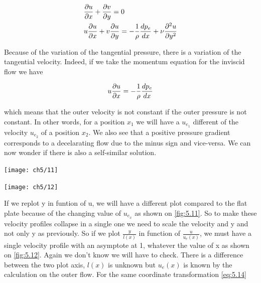 	\begin{equation}
		\begin{aligned}
		&\frac{\partial u}{\partial x} + \frac{\partial v}{\partial y} = 0\\
		&u \frac{\partial u}{\partial x} + v \frac{\partial u}{\partial y} =- \frac{1}{\rho} \frac{dp_e}{dx}+ \nu \frac{\partial ^2 u}{\partial y^2}
	\end{aligned}	
	\label{eq:5.44}
	\end{equation}
	
	Because of the variation of the tangential pressure, there is a variation of the tangential velocity. Indeed, if we take the momentum equation for the inviscid flow we have 
	
	\begin{equation}
		u \frac{\partial u}{\partial x} =- \frac{1}{\rho} \frac{dp_e}{dx}
	\end{equation}
	
	which means that the outer velocity is not constant if the outer pressure is not constant. In other words, for a position $x_1$ we will have a $u_{e_1}$ different of the velocity $u_{e_2}$ of a position $x_2$. We also see that a positive pressure gradient corresponds to a decelarating flow due to the minus sign and vice-versa. We can now wonder if there is also a self-similar solution. 
	
	\begin{center}
	\begin{minipage}{0.49\textwidth}
\begin{center}
	\texttt{[image: ch5/11]}
\end{center}
	\label{fig:5.11}
	\end{minipage}
	\begin{minipage}{0.49\textwidth}
\begin{center}
	\texttt{[image: ch5/12]}	
\end{center}
	\label{fig:5.12}
	\end{minipage}
	\end{center}
	
	If we replot y in funtion of u, we will have a different plot compared to the flat plate because of the changing value of $u_{e_x}$ as shown on \autoref{fig:5.11}. So to make these velocity profiles collapse in a single one we need to scale the velocity and y and not only y as previously. So if we plot $\frac{y}{l(x)}$ in function of $\frac{u}{u_e(x)}$, we must have a single velocity profile with an asymptote at 1, whatever the value of x as shown on \autoref{fig:5.12}. Again we don't know we will have to check. There is a difference between the two plot axis, $l(x)$ is unknown but $u_e(x)$ is known by the calculation on the outer flow. For the same coordinate transformation \eqref{eq:5.14}
	
